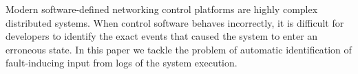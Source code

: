 Modern software-defined networking control platforms are highly complex distributed
systems. When control software behaves incorrectly, it is difficult
for developers to identify the exact events that caused the system to enter
an erroneous state. In this paper we tackle the problem of automatic
identification of fault-inducing input from logs of the system execution.

%
%
%
%
%
%


